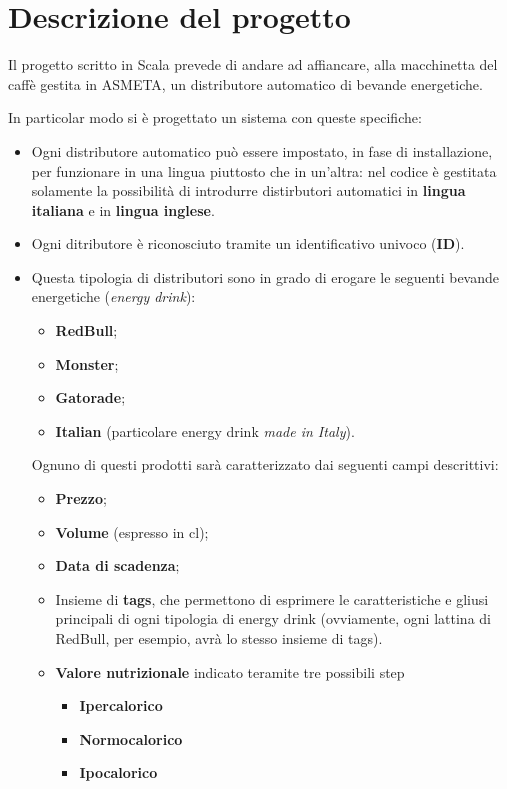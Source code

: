 \section{Descrizione del progetto}
Il progetto scritto in Scala prevede di andare ad affiancare, alla macchinetta del caffè gestita in ASMETA, un distributore automatico di bevande energetiche.

In particolar modo si è progettato un sistema con queste specifiche:
\begin{itemize}
	\item Ogni distributore automatico può essere impostato, in fase di installazione, per funzionare in una lingua piuttosto che in un'altra: nel codice è gestitata solamente la possibilità di introdurre distirbutori automatici in \textbf{lingua italiana} e in \textbf{lingua inglese}.
	\item Ogni ditributore è riconosciuto tramite un identificativo univoco (\textbf{ID}).
	\item Questa tipologia di distributori sono in grado di erogare le seguenti bevande energetiche (\textit{energy drink}):
	\begin{itemize}
		\item \textbf{RedBull};
		\item \textbf{Monster};
		\item \textbf{Gatorade};
		\item \textbf{Italian} (particolare energy drink \textit{made in Italy}).
	\end{itemize}
	Ognuno di questi prodotti sarà caratterizzato dai seguenti campi descrittivi:
	\begin{itemize}
		\item \textbf{Prezzo};
		\item \textbf{Volume} (espresso in cl);
		\item\textbf{Data di scadenza};
		\item Insieme di \textbf{tags}, che permettono di esprimere le caratteristiche e gliusi principali di ogni tipologia di energy drink (ovviamente, ogni lattina di RedBull, per esempio, avrà lo stesso insieme di tags).
		\item \textbf{Valore nutrizionale} indicato teramite tre possibili step
		\begin{itemize}
			\item \textbf{Ipercalorico}
			\item \textbf{Normocalorico}
			\item \textbf{Ipocalorico}
		\end{itemize}
	\end{itemize}
\end{itemize}

